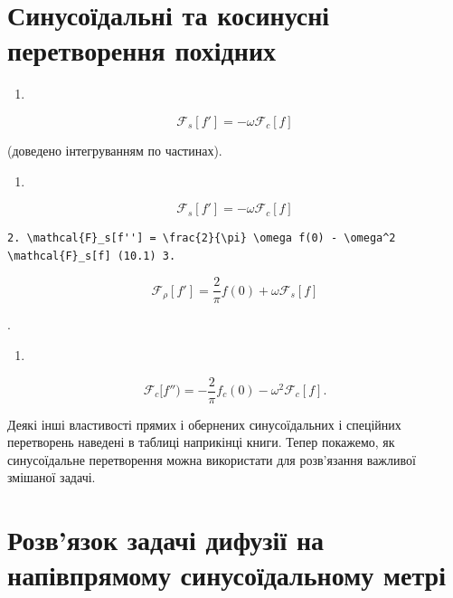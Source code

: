 \documentclass[
  ukrainian,
]{article}
\providecommand{\tightlist}{%
  \setlength{\itemsep}{0pt}\setlength{\parskip}{0pt}}
\begin{document}
\section{Синусоїдальні та косинусні перетворення
похідних}\label{ux441ux438ux43dux443ux441ux43eux457ux434ux430ux43bux44cux43dux456-ux442ux430-ux43aux43eux441ux438ux43dux443ux441ux43dux456-ux43fux435ux440ux435ux442ux432ux43eux440ux435ux43dux43dux44f-ux43fux43eux445ux456ux434ux43dux438ux445}

\begin{enumerate}
\def\labelenumi{\arabic{enumi}.}
\tightlist
\item
\end{enumerate}

\[
\mathcal{F}_s[f'] = -\omega \mathcal{F}_c[f]
\]

(доведено інтегруванням по частинах).

\begin{enumerate}
\def\labelenumi{\arabic{enumi}.}
\tightlist
\item
\end{enumerate}

\[
\mathcal{F}_s[f'] = -\omega \mathcal{F}_c[f]
\]

\begin{verbatim}
2. \mathcal{F}_s[f''] = \frac{2}{\pi} \omega f(0) - \omega^2 \mathcal{F}_s[f] (10.1) 3.
\end{verbatim}

\[
\mathcal{F}_{\rho}[f'] = \frac{2}{\pi} f(0) + \omega \mathcal{F}_{s}[f]
\]

.

\begin{enumerate}
\def\labelenumi{\arabic{enumi}.}
\setcounter{enumi}{3}
\tightlist
\item
\end{enumerate}

\[
\mathcal{F}_{c}[f'') = -\frac{2}{\pi} f_{c}(0) - \omega^{2} \mathcal{F}_{c}[f].
\]

Деякі інші властивості прямих і обернених синусоїдальних і спеційних
перетворень наведені в таблиці наприкінці книги. Тепер покажемо, як
синусоїдальне перетворення можна використати для розв'язання важливої
змішаної задачі.

\section{Розв'язок задачі дифузії на напівпрямому синусоїдальному
метрі}\label{ux440ux43eux437ux432ux44fux437ux43eux43a-ux437ux430ux434ux430ux447ux456-ux434ux438ux444ux443ux437ux456ux457-ux43dux430-ux43dux430ux43fux456ux432ux43fux440ux44fux43cux43eux43cux443-ux441ux438ux43dux443ux441ux43eux457ux434ux430ux43bux44cux43dux43eux43cux443-ux43cux435ux442ux440ux456}
\end{document}
